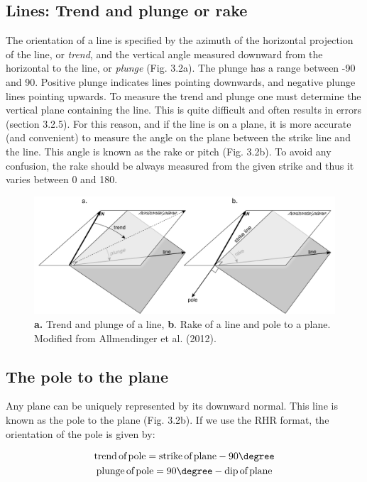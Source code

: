 \documentclass[a4paper , 12pt]{book}
\begin{document}
\subsection{Lines: Trend and plunge or rake}

The orientation of a line is specified by the azimuth of the horizontal projection of the line, or \textit{trend}, and the vertical angle measured downward from the horizontal to the line, or \textit{plunge} (Fig. 3.2a). The plunge has a range between -90 and 90\degree. Positive plunge indicates lines pointing downwards, and negative plunge lines pointing upwards. To measure the trend and plunge one must determine the vertical plane containing the line. This is quite difficult and often results in errors (section 3.2.5). For this reason, and if the line is on a plane, it is more accurate (and convenient) to measure the angle on the plane between the strike line and the line. This angle is known as the rake or pitch (Fig. 3.2b). To avoid any confusion, the rake should be always measured from the given strike and thus it varies between 0 and 180\degree.

\begin{figure}[ht]
    \centering
    \includegraphics[width=13cm]{ch3f2.pdf}
    \caption{\textbf{a.} Trend and plunge of a line, \textbf{b}. Rake of a line and pole to a plane. Modified from Allmendinger et al. (2012).}
\end{figure}

\subsection{The pole to the plane}

Any plane can be uniquely represented by its downward normal. This line is known as the pole to the plane (Fig. 3.2b). If we use the RHR format, the orientation of the pole is given by:

\begin{equation}\label{eq3.2}
    \begin{gathered}
        \text{trend\,of\,pole} = \text{strike\,of\,plane} -90\degree \\
        \text{plunge\,of\,pole} = 90\degree - \text{dip\,of\,plane}
    \end{gathered}
\end{equation}
\end{document}

